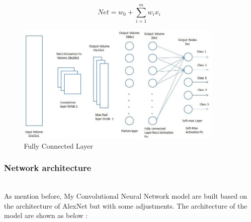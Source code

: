\documentclass[runningheads]{llncs}
\begin{document}
\begin{equation}
N e t=w_{0} +\sum_{i=1}^{m} w_{i} x_{i}
\end{equation}

\begin{figure}[H]
    \centering
    \includegraphics[width=10cm]{Figures/fc.jpeg}
    \caption{Fully Connected Layer}
    \label{fig:fc}
\end{figure}

\subsubsection{\large Network architecture}\hspace*{\fill} \\
As mention before, My Convolutional Neural Network model are built based on the architecture of AlexNet but with some adjustments. The architecture of the model are shown as below : 
\end{document}
